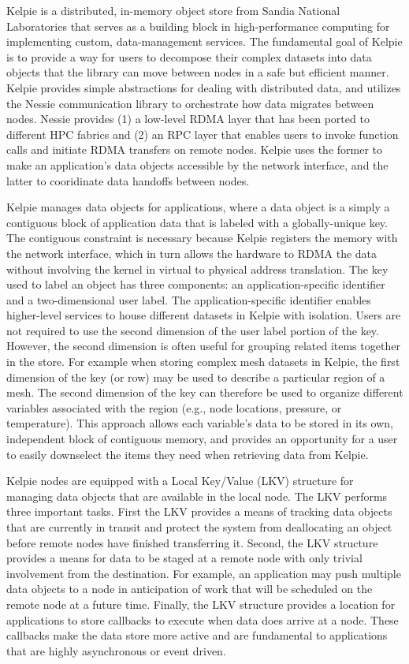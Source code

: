 Kelpie is a distributed, in-memory object store from Sandia National
Laboratories that serves as a building block in high-performance computing for
implementing custom, data-management services. The fundamental goal of Kelpie
is to provide a way for users to decompose their complex datasets into data
objects that the library can move between nodes in a safe but efficient manner.
Kelpie provides simple abstractions for dealing with distributed data, and
utilizes the Nessie communication library to orchestrate how data migrates
between nodes. Nessie provides (1) a low-level RDMA layer that has been ported
to different HPC fabrics and (2) an RPC layer that enables users to invoke
function calls and initiate RDMA transfers on remote nodes. Kelpie uses the
former to make an application's data objects accessible by the network
interface, and the latter to cooridinate data handoffs between nodes.

Kelpie manages data objects for applications, where a data object is a simply a
contiguous block of application data that is labeled with a globally-unique
key. The contiguous constraint is necessary because Kelpie registers the memory
with the network interface, which in turn allows the hardware to RDMA the data
without involving the kernel in virtual to physical address translation. The
key used to label an object has three components: an application-specific
identifier and a two-dimensional user label. The application-specific
identifier enables higher-level services to house different datasets in Kelpie
with isolation. Users are not required to use the second dimension of the user
label portion of the key. However, the second dimension is often useful for
grouping related items together in the store. For example when storing complex
mesh datasets in Kelpie, the first dimension of the key (or row) may be used to
describe a particular region of a mesh. The second dimension of the key can
therefore be used to organize different variables associated with the region
(e.g., node locations, pressure, or temperature). This approach allows each
variable's data to be stored in its own, independent block of contiguous
memory, and provides an opportunity for a user to easily downselect the items
they need when retrieving data from Kelpie.

Kelpie nodes are equipped with a Local Key/Value (LKV) structure for managing
data objects that are available in the local node. The LKV performs three
important tasks. First the LKV provides a means of tracking data objects that
are currently in transit and protect the system from deallocating an object
before remote nodes have finished transferring it. Second, the LKV structure
provides a means for data to be staged at a remote node with only trivial
involvement from the destination. For example, an application may push multiple
data objects to a node in anticipation of work that will be scheduled on the
remote node at a future time. Finally, the LKV structure provides a location
for applications to store callbacks to execute when data does arrive at a node.
These callbacks make the data store more active and are fundamental to
applications that are highly asynchronous or event driven.

